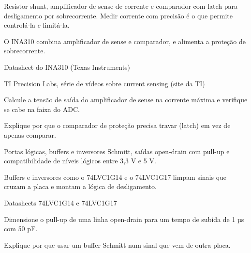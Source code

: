 Resistor shunt, amplificador de sense de corrente e comparador com latch para desligamento por sobrecorrente. Medir corrente com precisão é o que permite controlá-la e limitá-la.

\begin{noproduto}
O INA310 combina amplificador de sense e comparador, e alimenta a proteção de sobrecorrente.
\end{noproduto}

\begin{paraestudar}
  \item Datasheet do INA310 (Texas Instruments)
  \item TI Precision Labs, série de vídeos sobre current sensing (site da TI)
\end{paraestudar}

\begin{pratique}
  \item Calcule a tensão de saída do amplificador de sense na corrente máxima e verifique se cabe na faixa do ADC.
  \item Explique por que o comparador de proteção precisa travar (latch) em vez de apenas comparar.
\end{pratique}

Portas lógicas, buffers e inversores Schmitt, saídas open-drain com pull-up e compatibilidade de níveis lógicos entre 3,3 V e 5 V.

\begin{noproduto}
Buffers e inversores como o 74LVC1G14 e o 74LVC1G17 limpam sinais que cruzam a placa e montam a lógica de desligamento.
\end{noproduto}

\begin{paraestudar}
  \item {}
  \item {}
  \item Datasheets 74LVC1G14 e 74LVC1G17
\end{paraestudar}

\begin{pratique}
  \item Dimensione o pull-up de uma linha open-drain para um tempo de subida de 1 µs com 50 pF.
  \item Explique por que usar um buffer Schmitt num sinal que vem de outra placa.
\end{pratique}

